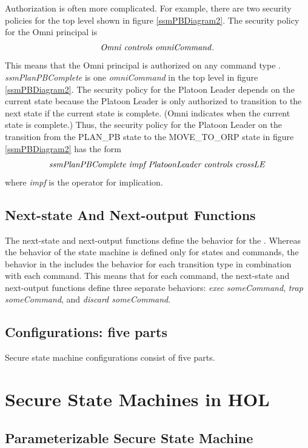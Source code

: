\documentclass[../../main/main.tex]{subfiles}
\begin{document}
Authorization is often more complicated.  For example, there are two security policies for the top level  shown in figure \ref{ssmPBDiagram2}.  The security policy for the Omni principal is
\[\text{\textit{Omni controls omniCommand}}.\]  This means that the Omni principal is authorized on any command type .  \textit{ssmPlanPBComplete} is one \textit{omniCommand} in the top level  in figure \ref{ssmPBDiagram2}.  The security policy for the Platoon Leader depends on the current state because the Platoon Leader is only authorized to transition to the next state if the current state is complete.  (Omni indicates when the current state is complete.)  Thus, the security policy for the Platoon Leader on the transition from the PLAN_PB state to the MOVE_TO_ORP state in figure \ref{ssmPBDiagram2} has the form \[\text{\textit{ssmPlanPBComplete impf PlatoonLeader controls crossLE}}\]where \textit{impf} is the  operator for implication.

\subsection{Next-state And Next-output Functions}
The next-state and next-output functions define the behavior for the .  Whereas the behavior of the state machine is defined only for states and commands, the behavior in the  includes the behavior for each transition type in combination with each command.  This means that for each command, the next-state and next-output functions define three separate behaviors: \textit{exec someCommand}, \textit{trap someCommand}, and \textit{discard someCommand}.  

\subsection{Configurations: five parts}
Secure state machine configurations consist of five parts.


\section{Secure State Machines in HOL}\label{sec:sminHOL}

\subsection{Parameterizable Secure State Machine}
\end{document}
